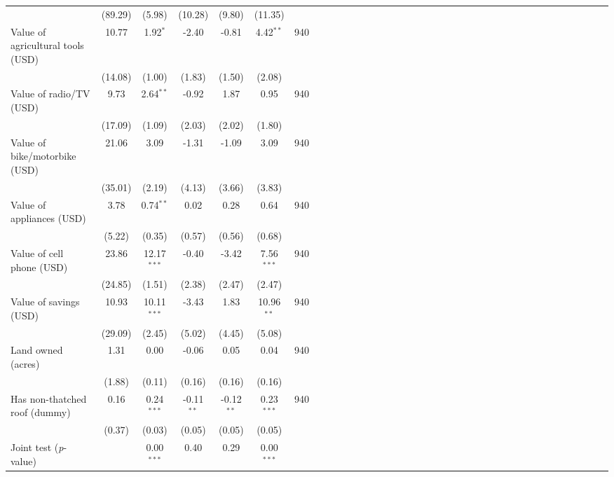 {\begin{tabular}{l*{6}{SSSSSc}}
          &  (89.29)&   (5.98)&  (10.28)&   (9.80)&  (11.35)&         \\
\hspace{0.2cm}Value of agricultural tools (USD)&    10.77&1.92$^{*}$&    -2.40&    -0.81&4.42$^{**}$&      940\\
          &  (14.08)&   (1.00)&   (1.83)&   (1.50)&   (2.08)&         \\
\hspace{0.2cm}Value of radio/TV (USD)&     9.73&2.64$^{**}$&    -0.92&     1.87&     0.95&      940\\
          &  (17.09)&   (1.09)&   (2.03)&   (2.02)&   (1.80)&         \\
\hspace{0.2cm}Value of bike/motorbike (USD)&    21.06&     3.09&    -1.31&    -1.09&     3.09&      940\\
          &  (35.01)&   (2.19)&   (4.13)&   (3.66)&   (3.83)&         \\
\hspace{0.2cm}Value of appliances (USD)&     3.78&0.74$^{**}$&     0.02&     0.28&     0.64&      940\\
          &   (5.22)&   (0.35)&   (0.57)&   (0.56)&   (0.68)&         \\
\hspace{0.2cm}Value of cell phone (USD)&    23.86&12.17$^{***}$&    -0.40&    -3.42&7.56$^{***}$&      940\\
          &  (24.85)&   (1.51)&   (2.38)&   (2.47)&   (2.47)&         \\
Value of savings (USD)&    10.93&10.11$^{***}$&    -3.43&     1.83&10.96$^{**}$&      940\\
          &  (29.09)&   (2.45)&   (5.02)&   (4.45)&   (5.08)&         \\
Land owned (acres)&     1.31&     0.00&    -0.06&     0.05&     0.04&      940\\
          &   (1.88)&   (0.11)&   (0.16)&   (0.16)&   (0.16)&         \\
Has non-thatched roof (dummy)&     0.16&0.24$^{***}$&-0.11$^{**}$&-0.12$^{**}$&0.23$^{***}$&      940\\
          &   (0.37)&   (0.03)&   (0.05)&   (0.05)&   (0.05)&         \\
\midrule Joint test (\emph{p}-value)&         &0.00$^{***}$&     0.40&     0.29&0.00$^{***}$&         \\
\bottomrule
\end{tabular}
}

